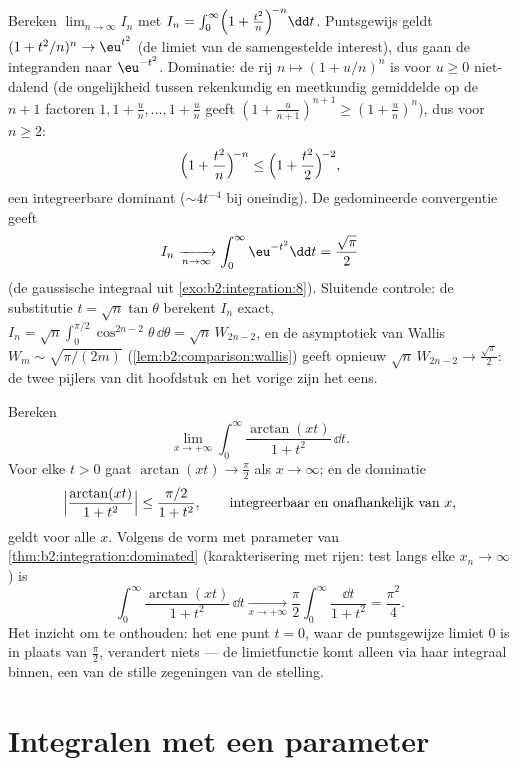 \begin{example}\label{ex:b2:integration:wallislimit}
Bereken $\displaystyle\lim_{n\to\infty} I_n$ met $I_n =
\int_0^\infty \Bigl(1 + \frac{t^2}{n}\Bigr)^{\!-n}\dd t$.
Puntsgewijs geldt $(1 + t^2/n)^n \to \eu^{t^2}$ (de limiet van de
samengestelde interest), dus gaan de integranden naar
$\eu^{-t^2}$. Dominatie: de rij $n \mapsto (1 + u/n)^n$ is voor $u
\geq 0$ niet-dalend (de ongelijkheid tussen rekenkundig en
meetkundig gemiddelde op de $n + 1$ factoren $1, 1 + \frac un,
\dots, 1 + \frac un$ geeft $(1 + \frac u{n+1})^{n+1} \geq (1 +
\frac un)^n$), dus voor $n \geq 2$:
\[
\Bigl(1 + \frac{t^2}{n}\Bigr)^{\!-n}
\leq \Bigl(1 + \frac{t^2}{2}\Bigr)^{\!-2},
\]
een integreerbare dominant ($\sim 4t^{-4}$ bij oneindig). De
gedomineerde convergentie geeft
\[
I_n \xrightarrow[n\to\infty]{} \int_0^\infty \eu^{-t^2}\dd t
= \frac{\sqrt\pi}{2}
\]
(de gaussische integraal uit \cref{exo:b2:integration:8}).
Sluitende controle: de substitutie $t = \sqrt n\tan\theta$ berekent
$I_n$ exact, $I_n = \sqrt n\int_0^{\pi/2}\cos^{2n-2}\theta\,
\dd\theta = \sqrt n\,W_{2n-2}$, en de asymptotiek van Wallis $W_m
\sim \sqrt{\pi/(2m)}$ (\cref{lem:b2:comparison:wallis}) geeft
opnieuw $\sqrt n\,W_{2n-2} \to \frac{\sqrt\pi}2$: de twee pijlers
van dit hoofdstuk en het vorige zijn het eens.
\end{example}

\begin{example}
\label{ex:b2:integration:arctanlimit}
Bereken
\[
\lim_{x\to+\infty}\int_0^\infty
\frac{\arctan(xt)}{1+t^2}\,\dd t .
\]
Voor elke $t > 0$ gaat $\arctan(xt) \to \frac\pi2$ als $x \to
\infty$; en de dominatie
\[
\Bigl|\frac{\arctan(xt)}{1+t^2}\Bigr|
\leq \frac{\pi/2}{1+t^2},
\qquad\text{integreerbaar en onafhankelijk van } x,
\]
geldt voor alle $x$. Volgens de vorm met  parameter van
\cref{thm:b2:integration:dominated} (karakterisering met rijen:
test langs elke $x_n \to \infty$) is
\[
\int_0^\infty\frac{\arctan(xt)}{1+t^2}\,\dd t
\xrightarrow[x\to+\infty]{}
\frac\pi2\int_0^\infty\frac{\dd t}{1+t^2}
= \frac{\pi^2}{4} .
\]
Het inzicht om te onthouden: het ene punt $t = 0$, waar de
puntsgewijze limiet $0$ is in plaats van $\frac\pi2$, verandert
niets --- de limietfunctie komt alleen via haar integraal binnen,
een van de stille zegeningen van de stelling.
\end{example}

\section{Integralen met een parameter}

